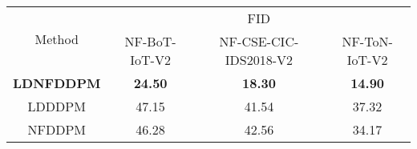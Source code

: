 \documentclass{standalone}
\begin{document}
\begin{tabular}{c||ccc}
\hline\hline
\multirow{2}{*}{Method} & \multicolumn{3}{c}{FID}                               \\
                        & NF-BoT-IoT-V2 & NF-CSE-CIC-IDS2018-V2 & NF-ToN-IoT-V2 \\ \hline
\textbf{LDNFDDPM}                & \textbf{24.50}         & \textbf{18.30}                 & \textbf{14.90}        \\\hline
LDDDPM                  & 47.15         & 41.54                 & 37.32         \\ \hline
NFDDPM                  & 46.28         & 42.56                 & 34.17         \\
\hline\hline
\end{tabular}
\end{document}
